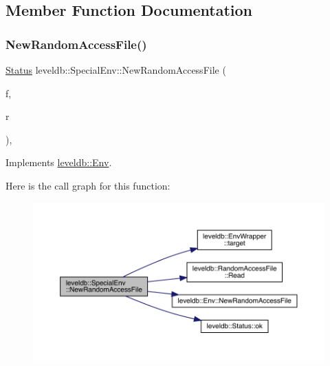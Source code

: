 \subsection{Member Function Documentation}
\mbox{\label{classleveldb_1_1_special_env_ae04ba2b7b94753d805e316dbda74ec00}} 
\subsubsection{\texorpdfstring{NewRandomAccessFile()}{NewRandomAccessFile()}}
{\footnotesize\ttfamily \mbox{\hyperlink{classleveldb_1_1_status}{Status}} leveldb\+::\+Special\+Env\+::\+New\+Random\+Access\+File (\begin{DoxyParamCaption}\item[{const std\+::string \&}]{f,  }\item[{\mbox{\hyperlink{classleveldb_1_1_random_access_file}{Random\+Access\+File}} $\ast$$\ast$}]{r }\end{DoxyParamCaption})\hspace{0.3cm}{\ttfamily [inline]}, {\ttfamily [virtual]}}



Implements \mbox{\hyperlink{classleveldb_1_1_env_a1df3e0bb2d47ee914448df9bb9ca0734}{leveldb\+::\+Env}}.

Here is the call graph for this function\+:
\nopagebreak
\begin{figure}[H]
\begin{center}
\leavevmode
\includegraphics[width=350pt]{classleveldb_1_1_special_env_ae04ba2b7b94753d805e316dbda74ec00_cgraph}
\end{center}
\end{figure}
\mbox{\label{classleveldb_1_1_special_env_a2a8b88051ccc5f957321d47af0dae5ed}} 
